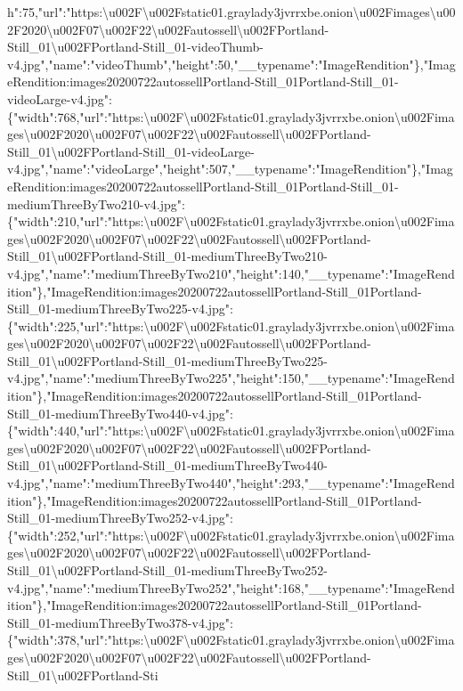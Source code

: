 h":75,"url":"https:\textbackslash{}u002F\textbackslash{}u002Fstatic01.graylady3jvrrxbe.onion\textbackslash{}u002Fimages\textbackslash{}u002F2020\textbackslash{}u002F07\textbackslash{}u002F22\textbackslash{}u002Fautossell\textbackslash{}u002FPortland-Still\_01\textbackslash{}u002FPortland-Still\_01-videoThumb-v4.jpg","name":"videoThumb","height":50,"\_\_typename":"ImageRendition"\},"ImageRendition:images20200722autossellPortland-Still\_01Portland-Still\_01-videoLarge-v4.jpg":\{"width":768,"url":"https:\textbackslash{}u002F\textbackslash{}u002Fstatic01.graylady3jvrrxbe.onion\textbackslash{}u002Fimages\textbackslash{}u002F2020\textbackslash{}u002F07\textbackslash{}u002F22\textbackslash{}u002Fautossell\textbackslash{}u002FPortland-Still\_01\textbackslash{}u002FPortland-Still\_01-videoLarge-v4.jpg","name":"videoLarge","height":507,"\_\_typename":"ImageRendition"\},"ImageRendition:images20200722autossellPortland-Still\_01Portland-Still\_01-mediumThreeByTwo210-v4.jpg":\{"width":210,"url":"https:\textbackslash{}u002F\textbackslash{}u002Fstatic01.graylady3jvrrxbe.onion\textbackslash{}u002Fimages\textbackslash{}u002F2020\textbackslash{}u002F07\textbackslash{}u002F22\textbackslash{}u002Fautossell\textbackslash{}u002FPortland-Still\_01\textbackslash{}u002FPortland-Still\_01-mediumThreeByTwo210-v4.jpg","name":"mediumThreeByTwo210","height":140,"\_\_typename":"ImageRendition"\},"ImageRendition:images20200722autossellPortland-Still\_01Portland-Still\_01-mediumThreeByTwo225-v4.jpg":\{"width":225,"url":"https:\textbackslash{}u002F\textbackslash{}u002Fstatic01.graylady3jvrrxbe.onion\textbackslash{}u002Fimages\textbackslash{}u002F2020\textbackslash{}u002F07\textbackslash{}u002F22\textbackslash{}u002Fautossell\textbackslash{}u002FPortland-Still\_01\textbackslash{}u002FPortland-Still\_01-mediumThreeByTwo225-v4.jpg","name":"mediumThreeByTwo225","height":150,"\_\_typename":"ImageRendition"\},"ImageRendition:images20200722autossellPortland-Still\_01Portland-Still\_01-mediumThreeByTwo440-v4.jpg":\{"width":440,"url":"https:\textbackslash{}u002F\textbackslash{}u002Fstatic01.graylady3jvrrxbe.onion\textbackslash{}u002Fimages\textbackslash{}u002F2020\textbackslash{}u002F07\textbackslash{}u002F22\textbackslash{}u002Fautossell\textbackslash{}u002FPortland-Still\_01\textbackslash{}u002FPortland-Still\_01-mediumThreeByTwo440-v4.jpg","name":"mediumThreeByTwo440","height":293,"\_\_typename":"ImageRendition"\},"ImageRendition:images20200722autossellPortland-Still\_01Portland-Still\_01-mediumThreeByTwo252-v4.jpg":\{"width":252,"url":"https:\textbackslash{}u002F\textbackslash{}u002Fstatic01.graylady3jvrrxbe.onion\textbackslash{}u002Fimages\textbackslash{}u002F2020\textbackslash{}u002F07\textbackslash{}u002F22\textbackslash{}u002Fautossell\textbackslash{}u002FPortland-Still\_01\textbackslash{}u002FPortland-Still\_01-mediumThreeByTwo252-v4.jpg","name":"mediumThreeByTwo252","height":168,"\_\_typename":"ImageRendition"\},"ImageRendition:images20200722autossellPortland-Still\_01Portland-Still\_01-mediumThreeByTwo378-v4.jpg":\{"width":378,"url":"https:\textbackslash{}u002F\textbackslash{}u002Fstatic01.graylady3jvrrxbe.onion\textbackslash{}u002Fimages\textbackslash{}u002F2020\textbackslash{}u002F07\textbackslash{}u002F22\textbackslash{}u002Fautossell\textbackslash{}u002FPortland-Still\_01\textbackslash{}u002FPortland-Sti